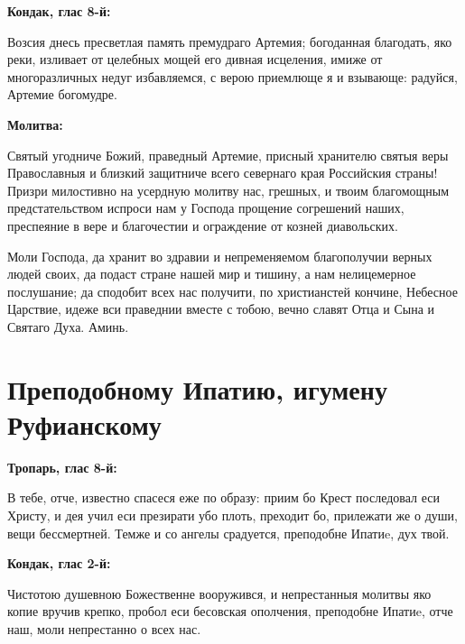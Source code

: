 \medskip


\bfseries Кондак, глас 8-й:\normalfont{}\nopagebreak


Возсия днесь пресветлая память премудраго Артемия; богоданная благодать, яко реки, изливает от целебных мощей его дивная исцеления, имиже от многоразличных недуг избавляемся, с верою приемлюще я и взывающе: радуйся, Артемие богомудре.


\medskip


\bfseries Молитва:\normalfont{}\nopagebreak


Святый угодниче Божий, праведный Артемие, присный хранителю святыя веры Православныя и близкий защитниче всего севернаго края Российския страны! Призри милостивно на усердную молитву нас, грешных, и твоим благомощным предстательством испроси нам у Господа прощение согрешений наших, преспеяние в вере и благочестии и ограждение от козней диавольских. 

Моли Господа, да хранит во здравии и непременяемом благополучии верных людей своих, да подаст стране нашей мир и тишину, а нам нелицемерное послушание; да сподобит всех нас получити, по христианстей кончине, Небесное Царствие, идеже вси праведнии вместе с тобою, вечно славят Отца и Сына и Святаго Духа. Аминь.


\bigskip\bigskip\mychapterending


 

\section{Преподобному Ипатию, игумену Руфианскому}
 


\bfseries Тропарь, глас 8-й:\normalfont{}\nopagebreak


В тебе, отче, известно спасеся еже по образу: приим бо Крест последовал еси Христу, и дея учил еси презирати убо плоть, преходит бо, прилежати же о души, вещи бессмертней.  Темже и со ангелы срадуется, преподобне Ипатиe, дух твой.


\medskip


\bfseries Кондак, глас 2-й:\normalfont{}\nopagebreak


Чистотою душевною Божественне вооружився, и непрестанныя молитвы яко копие вручив крепко, пробол еси бесовская ополчения, преподобне Ипатиe, отче наш, моли непрестанно о всех нас.


